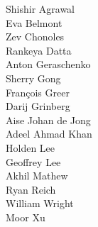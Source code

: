 Shishir Agrawal\\
Eva Belmont\\
Zev Chonoles\\
Rankeya Datta\\
Anton Geraschenko\\
Sherry Gong\\
Fran\c{c}ois Greer\\
Darij Grinberg\\
Aise Johan de Jong\\
Adeel Ahmad Khan\\
Holden Lee\\
Geoffrey Lee\\
Akhil Mathew\\
Ryan Reich\\
William Wright\\
Moor Xu\\
